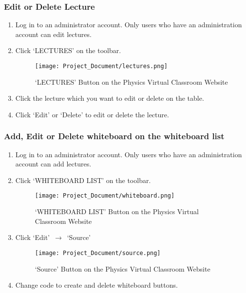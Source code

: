 \documentclass[10pt]{article}
\begin{document}
        \subsubsection{Edit or Delete Lecture}
            \begin{enumerate}
            	\item Log in to an administrator account. Only users who have an administration account can edit lectures.
         	
            	\item Click `LECTURES' on the toolbar.
            	    \begin{figure}[!ht]
            	        \centering
                        \texttt{[image: Project\_Document/lectures.png]}
                        \caption{`LECTURES' Button on the Physics Virtual Classroom Website}
                    \end{figure}
            	\item Click the lecture which you want to edit or delete on the table.
            	\item Click `Edit' or `Delete' to edit or delete the lecture.
            \end{enumerate}
 
        \subsubsection{Add, Edit or Delete whiteboard on the whiteboard list}
            \begin{enumerate}
            	\item Log in to an administrator account. Only users who have an administration account can add lectures.
            	\item Click `WHITEBOARD LIST' on the toolbar.
            	    \begin{figure}[!ht]
            	        \centering
                        \texttt{[image: Project\_Document/whiteboard.png]}
                        \caption{`WHITEBOARD LIST' Button on the Physics Virtual Classroom Website}
                    \end{figure}
\newpage                   
            	\item Click `Edit' $\,\to\,$ `Source' 
            	    \begin{figure}[!ht]
            	        \centering
                        \texttt{[image: Project\_Document/source.png]}
                        \caption{`Source' Button on the Physics Virtual Classroom Website}
                    \end{figure}
            	\item Change code to create and delete whiteboard buttons. 
            \end{enumerate}
        
\end{document}

